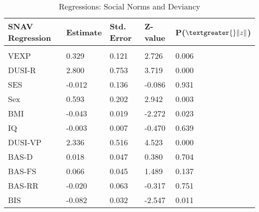\documentclass[utf8]{article}
\begin{document}
\begin{table}[]
\begin{tabular}{lllll}
SNAV Regression  & Estimate & Std. Error & Z-value & P($\textgreater{}\|z\|$) \\ \hline
                 &          &            &         &                          \\
VEXP             & 0.329    & 0.121      & 2.726   & 0.006                    \\
DUSI-R           & 2.800    & 0.753      & 3.719   & 0.000                    \\
SES              & -0.012   & 0.136      & -0.086  & 0.931                    \\
Sex              & 0.593    & 0.202      & 2.942   & 0.003                    \\
BMI              & -0.043   & 0.019      & -2.272  & 0.023                    \\
IQ               & -0.003   & 0.007      & -0.470  & 0.639                    \\
DUSI-VP          & 2.336    & 0.516      & 4.523   & 0.000                    \\
BAS-D            & 0.018    & 0.047      & 0.380   & 0.704                    \\
BAS-FS           & 0.066    & 0.045      & 1.489   & 0.137                    \\
BAS-RR           & -0.020   & 0.063      & -0.317  & 0.751                    \\
BIS              & -0.082   & 0.032      & -2.547  & 0.011                   
\end{tabular}
\caption{Regressions: Social Norms and Deviancy\label{tab:10}}
\end{table}
\end{document}
